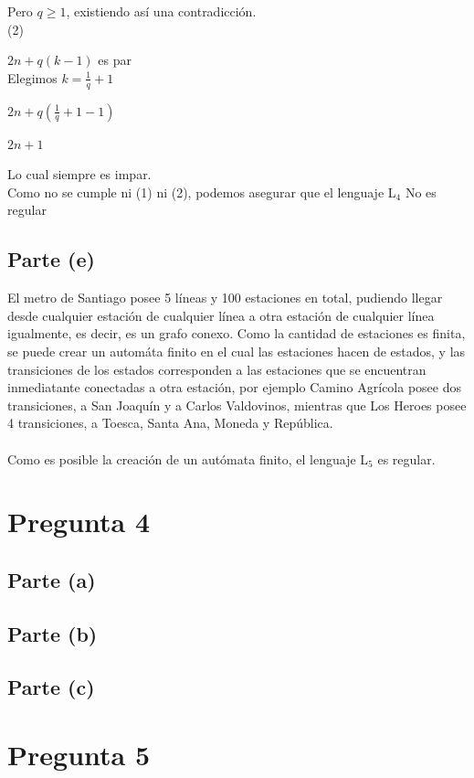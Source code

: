 \documentclass[11pt,letterpaper]{article}
\begin{document}
Pero $q \geqslant 1$, existiendo así una contradicción.
 \\
 
(2) 

$2n+q(k-1)$ es par
 \\
 
Elegimos $k = \frac{1}{q} + 1$

$2n+q(\frac{1}{q} + 1 -1)$

$2n+1$

Lo cual siempre es impar.
 \\

Como no se cumple ni (1) ni (2), podemos asegurar que el lenguaje L$_{4}$ No es regular


\subsection{Parte (e)}
El metro de Santiago posee 5 líneas y 100 estaciones en total, pudiendo llegar desde cualquier estación de cualquier línea a otra estación de cualquier línea igualmente, es decir, es un grafo conexo. Como la cantidad de estaciones es finita, se puede crear un automáta finito en el cual las estaciones hacen de estados, y las transiciones de los estados corresponden a las estaciones que se encuentran inmediatante conectadas a otra estación, por ejemplo Camino Agrícola posee dos transiciones, a San Joaquín y a Carlos Valdovinos, mientras que Los Heroes posee 4 transiciones, a Toesca, Santa Ana, Moneda y República.
 \\
 \\
Como es posible la creación de un autómata finito, el lenguaje L$_{5}$ es regular.


\section{Pregunta 4}
\subsection{Parte (a)}
\subsection{Parte (b)}
\subsection{Parte (c)}

\section{Pregunta 5}
\end{document}
